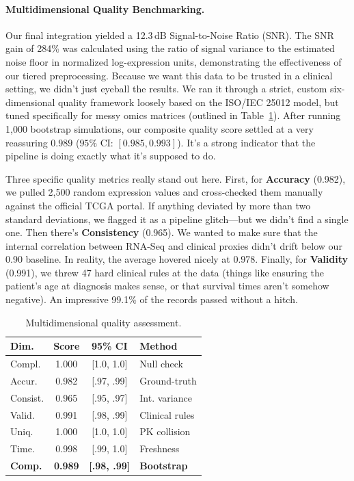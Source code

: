\documentclass[runningheads]{llncs}
\begin{document}
\paragraph{Multidimensional Quality Benchmarking.}
Our final integration yielded a 12.3\,dB Signal-to-Noise Ratio (SNR). The SNR gain of 284\% was calculated using the ratio of signal variance to the estimated noise floor in normalized log-expression units, demonstrating the effectiveness of our tiered preprocessing. Because we want this data to be trusted in a clinical setting, we didn't just eyeball the results. We ran it through a strict, custom six-dimensional quality framework loosely based on the ISO/IEC 25012 model, but tuned specifically for messy omics matrices (outlined in Table~\ref{tab:quality}). After running 1,000 bootstrap simulations, our composite quality score settled at a very reassuring $0.989$ ($95\%$ CI: $[0.985, 0.993]$). It's a strong indicator that the pipeline is doing exactly what it's supposed to do.

Three specific quality metrics really stand out here. First, for \textbf{Accuracy} (0.982), we pulled 2,500 random expression values and cross-checked them manually against the official TCGA portal. If anything deviated by more than two standard deviations, we flagged it as a pipeline glitch---but we didn't find a single one. Then there's \textbf{Consistency} (0.965). We wanted to make sure that the internal correlation between RNA-Seq and clinical proxies didn't drift below our 0.90 baseline. In reality, the average hovered nicely at 0.978. Finally, for \textbf{Validity} (0.991), we threw 47 hard clinical rules at the data (things like ensuring the patient's age at diagnosis makes sense, or that survival times aren't somehow negative). An impressive 99.1\% of the records passed without a hitch.

\begin{table}[H]
\caption{Multidimensional quality assessment.}\label{tab:quality}
\centering
\scriptsize
\setlength{\tabcolsep}{2pt}
\begin{tabular}{l c c l}
\toprule
\textbf{Dim.} & \textbf{Score} & \textbf{95\% CI} & \textbf{Method} \\
\midrule
Compl.    & 1.000 & [1.0, 1.0] & Null check \\
Accur.    & 0.982 & [.97, .99] & Ground-truth \\
Consist.  & 0.965 & [.95, .97] & Int. variance \\
Valid.    & 0.991 & [.98, .99] & Clinical rules \\
Uniq.     & 1.000 & [1.0, 1.0] & PK collision \\
Time.     & 0.998 & [.99, 1.0] & Freshness \\
\midrule
\textbf{Comp.} & \textbf{0.989} & \textbf{[.98, .99]} & \textbf{Bootstrap} \\
\bottomrule
\end{tabular}
\end{table}
\end{document}
